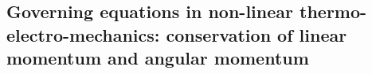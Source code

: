 





\subsection{Governing equations in non-linear thermo-electro-mechanics: conservation of linear momentum and angular momentum}\label{sec:conservation of linear momentum}

